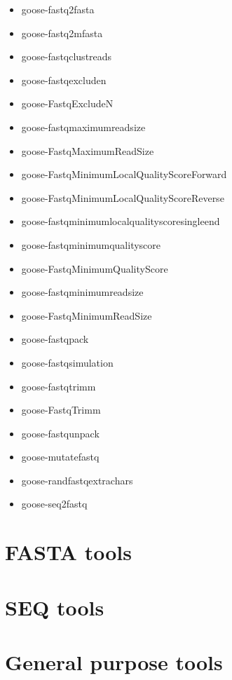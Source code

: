 \documentclass[11pt,journal,compsoc]{report}[1]
\begin{document}
\begin{itemize}
\item goose-fastq2fasta
\item goose-fastq2mfasta
\item goose-fastqclustreads
\item goose-fastqexcluden
\item goose-FastqExcludeN
\item goose-fastqmaximumreadsize
\item goose-FastqMaximumReadSize
\item goose-FastqMinimumLocalQualityScoreForward
\item goose-FastqMinimumLocalQualityScoreReverse
\item goose-fastqminimumlocalqualityscoresingleend
\item goose-fastqminimumqualityscore
\item goose-FastqMinimumQualityScore
\item goose-fastqminimumreadsize
\item goose-FastqMinimumReadSize
\item goose-fastqpack
\item goose-fastqsimulation
\item goose-fastqtrimm
\item goose-FastqTrimm
\item goose-fastqunpack
\item goose-mutatefastq
\item goose-randfastqextrachars
\item goose-seq2fastq
\end{itemize}


\chapter*{FASTA tools}



\chapter*{SEQ tools}

\chapter*{General purpose tools}
\end{document}

